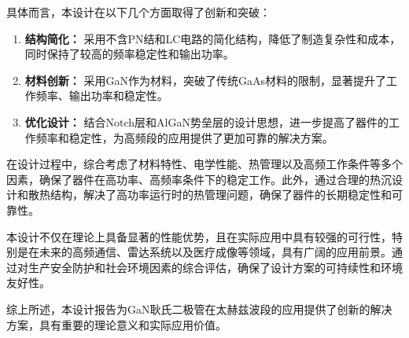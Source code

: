 \documentclass[12pt,hyperref,a4paper,UTF8]{ctexart}
\begin{document}
具体而言，本设计在以下几个方面取得了创新和突破：
\begin{enumerate}
    \item \textbf{结构简化：} 采用不含PN结和LC电路的简化结构，降低了制造复杂性和成本，同时保持了较高的频率稳定性和输出功率。
    \item \textbf{材料创新：} 采用GaN作为材料，突破了传统GaAs材料的限制，显著提升了工作频率、输出功率和稳定性。
    \item \textbf{优化设计：} 结合Notch层和AlGaN势垒层的设计思想，进一步提高了器件的工作频率和稳定性，为高频段的应用提供了更加可靠的解决方案。
\end{enumerate}

在设计过程中，综合考虑了材料特性、电学性能、热管理以及高频工作条件等多个因素，确保了器件在高功率、高频率条件下的稳定工作。此外，通过合理的热沉设计和散热结构，解决了高功率运行时的热管理问题，确保了器件的长期稳定性和可靠性。

本设计不仅在理论上具备显著的性能优势，且在实际应用中具有较强的可行性，特别是在未来的高频通信、雷达系统以及医疗成像等领域，具有广阔的应用前景。通过对生产安全防护和社会环境因素的综合评估，确保了设计方案的可持续性和环境友好性。

综上所述，本设计报告为GaN耿氏二极管在太赫兹波段的应用提供了创新的解决方案，具有重要的理论意义和实际应用价值。


\newpage


\end{document}
